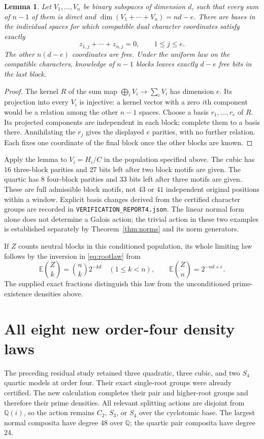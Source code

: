 \documentclass[11pt]{article}
\newtheorem{lemma}[theorem]{Lemma}
\theoremstyle{definition}\newtheorem{definition}[theorem]{Definition}
\newcommand{\Q}{\mathbb Q}
\newcommand{\EE}{\mathbb E}
\begin{document}
\begin{lemma}\label{lem:parityform}
Let $V_1,\ldots,V_n$ be binary subspaces of dimension $d$, such that
every sum of $n-1$ of them is direct and
$\dim(V_1+\cdots+V_n)=nd-e$. There are bases in the individual
spaces for which compatible dual character coordinates satisfy
exactly
\[
 z_{1,j}+\cdots+z_{n,j}=0,\qquad 1\le j\le e.
\]
The other $n(d-e)$ coordinates are free. Under the uniform law on
the compatible characters, knowledge of $n-1$ blocks leaves
exactly $d-e$ free bits in the last block.
\end{lemma}
\begin{proof}
The kernel $R$ of the sum map $\bigoplus_iV_i\to\sum_iV_i$ has
dimension $e$. Its projection into every $V_i$ is injective:
a kernel vector with a zero $i$th component would be a relation
among the other $n-1$ spaces. Choose a basis $r_1,\ldots,r_e$ of
$R$. Its projected components are independent in each block;
complete them to a basis there. Annihilating the $r_j$ gives the
displayed $e$ parities, with no further relation. Each fixes one
coordinate of the final block once the other blocks are known.
\end{proof}

Apply the lemma to $V_i=H_i/C$ in the population specified above.
The cubic has $16$ three-block parities and $27$ bits left after
two block motifs are given. The quartic has $8$ four-block
parities and $33$ bits left after three motifs are given.
These are full admissible block motifs, not $43$ or $41$
independent original positions within a window.
Explicit basis changes derived from the certified character
groups are recorded in \texttt{VERIFICATION\_REPORT4.json}.
The linear normal form alone does not determine a Galois action;
the trivial action in these two examples is established separately
by Theorem~\ref{thm:norms} and its norm generators.

If $Z$ counts neutral blocks in this conditioned population, its
whole limiting law follows by the inversion in \eqref{eq:rootlaw}
from
\[
 \EE\binom Zk=\binom nk2^{-kd}\quad(1\le k<n),
 \qquad \EE\binom Zn=2^{-nd+e}.
\]
The supplied exact fractions distinguish this law from the
unconditioned prime-existence densities above.

\section{All eight new order-four density laws}\label{sec:order4}
The preceding residual study retained three quadratic, three cubic,
and two $S_4$ quartic models at order four. Their exact single-root
groups were already certified. The new calculation completes their
pair and higher-root groups and therefore their prime densities.
All relevant splitting actions are disjoint from $\Q(i)$, so the
action remains $C_2$, $S_3$, or $S_4$ over the cyclotomic base.
The largest normal composita have degree $48$ over $\Q$; the
quartic pair composita have degree $24$.
\end{document}

